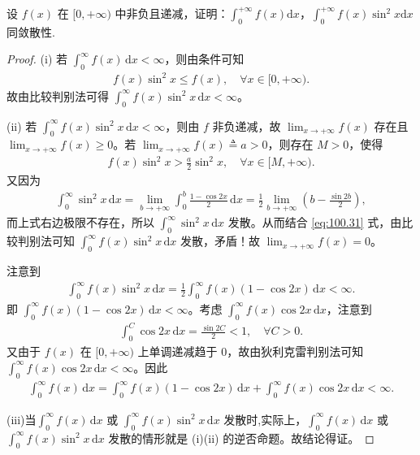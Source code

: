 \documentclass[../../main.tex]{subfiles}%
\begin{document}
\begin{example}
设 \(f(x)\) 在 \([0,+\infty)\) 中非负且递减，证明：\(\int_{0}^{+\infty} f(x) \mathrm{d}x\)，\(\int_{0}^{+\infty} f(x)\sin^{2}x \mathrm{d}x\) 同敛散性. 
\end{example}
\begin{proof}

(i) 若 \(\int_0^\infty f(x) \, \mathrm{d}x < \infty\)，则由条件可知
\begin{align*}
f(x) \sin^2 x \leqslant f(x), \quad \forall x \in [0, +\infty).
\end{align*}
故由比较判别法可得 \(\int_0^\infty f(x) \sin^2 x \, \mathrm{d}x < \infty\)。

(ii) 若 \(\int_0^\infty f(x) \sin^2 x \, \mathrm{d}x < \infty\)，则由 \(f\) 非负递减，故 \(\lim_{x \to +\infty} f(x)\) 存在且 \(\lim_{x \to +\infty} f(x) \geqslant 0\)。若 \(\lim_{x \to +\infty} f(x) \triangleq a > 0\)，则存在 \(M > 0\)，使得
\begin{align}
f(x) \sin^2 x > \frac{a}{2} \sin^2 x, \quad \forall x \in [M, +\infty). \label{eq:100.31}
\end{align}
又因为
\begin{align*}
\int_0^\infty \sin^2 x \, \mathrm{d}x = \lim_{b \to +\infty} \int_0^b \frac{1 - \cos 2x}{2} \, \mathrm{d}x = \frac{1}{2} \lim_{b \to +\infty} \left( b - \frac{\sin 2b}{2} \right),
\end{align*}
而上式右边极限不存在，所以 \(\int_0^\infty \sin^2 x \, \mathrm{d}x\) 发散。从而结合 \eqref{eq:100.31} 式，由比较判别法可知 \(\int_0^\infty f(x) \sin^2 x \, \mathrm{d}x\) 发散，矛盾！故 \(\lim_{x \to +\infty} f(x) = 0\)。

注意到
\begin{align*}
\int_0^\infty f(x) \sin^2 x \, \mathrm{d}x = \frac{1}{2} \int_0^\infty f(x) (1 - \cos 2x) \, \mathrm{d}x < \infty.
\end{align*}
即 \(\int_0^\infty f(x) (1 - \cos 2x) \, \mathrm{d}x < \infty\)。考虑 \(\int_0^\infty f(x) \cos 2x \, \mathrm{d}x\)，注意到
\begin{align*}
\int_0^C \cos 2x \, \mathrm{d}x = \frac{\sin 2C}{2} < 1, \quad \forall C > 0.
\end{align*}
又由于 \(f(x)\) 在 \([0, +\infty)\) 上单调递减趋于 0，故由狄利克雷判别法可知 \(\int_0^\infty f(x) \cos 2x \, \mathrm{d}x < \infty\)。因此
\begin{align*}
\int_0^\infty f(x) \, \mathrm{d}x = \int_0^\infty f(x) (1 - \cos 2x) \, \mathrm{d}x + \int_0^\infty f(x) \cos 2x \, \mathrm{d}x < \infty.
\end{align*}

(iii)当\(\int_0^\infty f(x) \, \mathrm{d}x\) 或 \(\int_0^\infty f(x) \sin^2 x \, \mathrm{d}x\) 发散时,实际上，\(\int_0^\infty f(x) \, \mathrm{d}x\) 或 \(\int_0^\infty f(x) \sin^2 x \, \mathrm{d}x\) 发散的情形就是 (i)(ii) 的逆否命题。故结论得证。

\end{proof}
\end{document}
